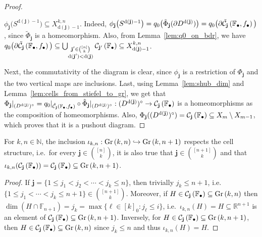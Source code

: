 \begin{proof}
\begin{i_enum}
\item $\phi_{\mathbf{j}}\big(S^{\mathrm{d}(\mathbf{j})-1}\big)\subseteq X_{\mathrm{d}(\mathbf{j})-1}^{k,n}$. Indeed, $\phi_{\mathbf{j}}\big(S^{\mathrm{d}(\mathbf{j})-1}\big)=q_0\big(\tilde{\Phi}_{\mathbf{j}}(\partial D^{\mathrm{d}(\mathbf{j})})\big)=q_0\big(\partial\tilde{\mathcal{C}}_{\mathbf{j}}\left(\mathbb{F}_{\bullet},f_{\bullet}\right)\big)$, since $\tilde{\Phi}_{\mathbf{j}}$ is a homeomorphism. Also, from Lemma~\ref{lem:q0_on_bdr}, we have $q_0\big(\partial\tilde{\mathcal{C}}_{\mathbf{j}}\left(\mathbb{F}_{\bullet},f_{\bullet}\right)\big)\subseteq\bigcup_{\substack{\mathbf{j}'\in\binom{[n]}{k}\\\mathrm{d}(\mathbf{j}')<\mathrm{d}(\mathbf{j})}}\mathcal{C}_{\mathbf{j'}}\left(\mathbb{F}_{\bullet}\right)\subseteq X_{\mathrm{d}(\mathbf{j})-1}^{k,n}$.
\end{i_enum}
Next, the commutativity of the diagram is clear, since $\phi_{\mathbf{j}}$ is a restriction of $\Phi_{\mathbf{j}}$ and the two vertical maps are inclusions. Last, using Lemma~\ref{lem:shub_dim} and Lemma~\ref{lem:cells_from_stiefel_to_gr}, we get that $\Phi_{\mathbf{j}}|_{(D^{\mathrm{d}(\mathbf{j})})^{\circ}}=q_0|_{\tilde{\mathcal{C}}_{\mathbf{j}}\left(\mathbb{F}_{\bullet},f_{\bullet}\right)}\circ\tilde{\Phi}_{\mathbf{j}}|_{(D^{\mathrm{d}(\mathbf{j})})^{\circ}}:(D^{\mathrm{d}(\mathbf{j})})^{\circ}\to\mathcal{C}_{\mathbf{j}}\left(\mathbb{F}_{\bullet}\right)$ is a homeomorphisms as the composition of homeomorphisms. Also, $\Phi_{\mathbf{j}}((D^{\mathrm{d}(\mathbf{j})})^{\circ})=\mathcal{C}_{\mathbf{j}}\left(\mathbb{F}_{\bullet}\right)\subseteq X_m\setminus X_{m-1}$, which proves that it is a pushout diagram.
\end{proof}

\begin{proposition}\label{prop:included_cell} For $k,n\in\mathbb{N}$, the inclusion $\iota_{k,n}:\Gr{k}{n}\hookrightarrow\Gr{k}{n+1}$ respects the cell structure, i.e.\ for every $\mathbf{j}\in\binom{[n]}{k}$, it is also true that $\mathbf{j}\in\binom{[n+1]}{k}$ and that $\iota_{k,n}(\grcell{j})=\grcell{j}\subseteq\Gr{k}{n+1}$.
\end{proposition}
\begin{proof} If $\mathbf{j}=\{1\leq j_1<j_2<\cdots<j_k\leq n\}$, then trivially $j_k\leq n+1$, i.e.\ $\{1\leq j_1<\cdots<j_k\leq n+1\}\in\binom{[n+1]}{k}$. Moreover, if $H\in\grcell{j}\subseteq\Gr{k}{n}$ then $\dim(H\cap\mathbb{F}_{n+1})=j_k=\max\{\ell\in[k]_0:j_{\ell}\leq i\}$, i.e.\ $\iota_{k,n}(H)=H\subseteq\mathbb{R}^{n+1}$ is an element of $\grcell{j}\subseteq\Gr{k}{n+1}$. Inversely, for $H\in\grcell{j}\subseteq\Gr{k}{n+1}$, then $H\in\grcell{j}\subseteq\Gr{k}{n}$ since $j_k\leq n$ and thus $\iota_{k,n}(H)=H$.
\end{proof}

